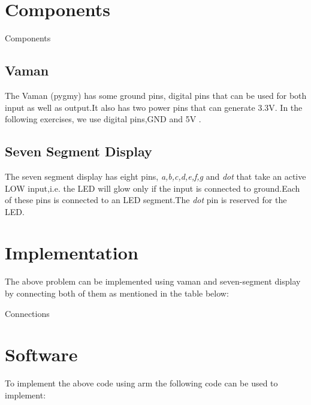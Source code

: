 \documentclass[10pt,a4paper]{article}
\begin{document}
\section{Components}
\begin{table}[!h]
\centering

\caption{Components}
\label{table:components}
\end{table}
\subsection{Vaman} 
The Vaman (pygmy) has some ground pins, digital pins that can be used for both input as well as output.It also has two power pins that can generate 3.3V. In the following exercises, we use digital pins,GND and 5V .
\subsection{Seven Segment Display}
The seven segment display has eight pins, \emph{a,b,c,d,e,f,g} and \emph{dot} that take an active LOW input,i.e. the LED will glow only if the input is connected to ground.Each of these pins is connected to an LED segment.The \emph{dot} pin is reserved for the LED.
\section{Implementation}
The above problem can be implemented using vaman and seven-segment display by connecting both of them as mentioned in the table below:
\begin{table}[h]
	\centering
	
	\caption{Connections}
	\label{table:Connections}
\end{table}
\section{Software}
To implement the above code using arm the following code can be used to implement:

\end{document}
